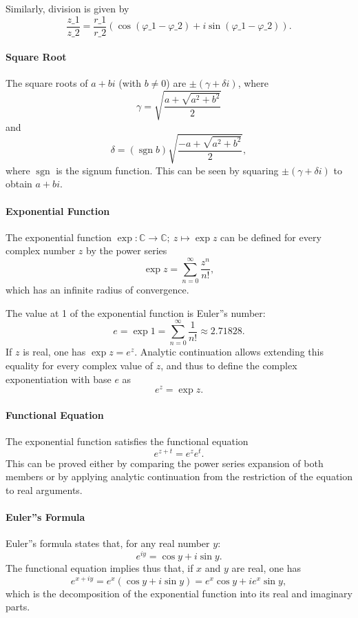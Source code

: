 Similarly, division is given by
$$
\frac{z\_1}{z\_2} = \frac{r\_1}{r\_2} \left(\cos (\varphi\_1 - \varphi\_2) + i \sin (\varphi\_1 - \varphi\_2)\right).
$$
\paragraph{Square Root}

The square roots of $a + bi$ (with $b \ne 0$) are $\pm (\gamma + \delta i)$, where
$$
\gamma = \sqrt{\frac{a + \sqrt{a^2 + b^2}}{2}}
$$
and
$$
\delta = (\operatorname{sgn} b) \sqrt{\frac{-a + \sqrt{a^2 + b^2}}{2}},
$$
where $\operatorname{sgn}$ is the signum function. This can be seen by squaring $\pm (\gamma + \delta i)$ to obtain $a + bi$.

\paragraph{Exponential Function}

The exponential function $\exp: \mathbb{C} \to \mathbb{C};\ z \mapsto \exp z$ can be defined for every complex number $z$ by the power series
$$
\exp z = \sum_{n=0}^{\infty} \frac{z^n}{n!},
$$
which has an infinite radius of convergence.

The value at 1 of the exponential function is Euler''s number:
$$
e = \exp 1 = \sum_{n=0}^{\infty} \frac{1}{n!} \approx 2.71828.
$$
If $z$ is real, one has $\exp z = e^z$. Analytic continuation allows extending this equality for every complex value of $z$, and thus to define the complex exponentiation with base $e$ as
$$
e^z = \exp z.
$$
\paragraph{Functional Equation}

The exponential function satisfies the functional equation
$$
e^{z + t} = e^z e^t.
$$
This can be proved either by comparing the power series expansion of both members or by applying analytic continuation from the restriction of the equation to real arguments.

\paragraph{Euler''s Formula}

Euler''s formula states that, for any real number $y$:
$$
e^{iy} = \cos y + i \sin y.
$$
The functional equation implies thus that, if $x$ and $y$ are real, one has
$$
e^{x + iy} = e^x (\cos y + i \sin y) = e^x \cos y + i e^x \sin y,
$$
which is the decomposition of the exponential function into its real and imaginary parts.

